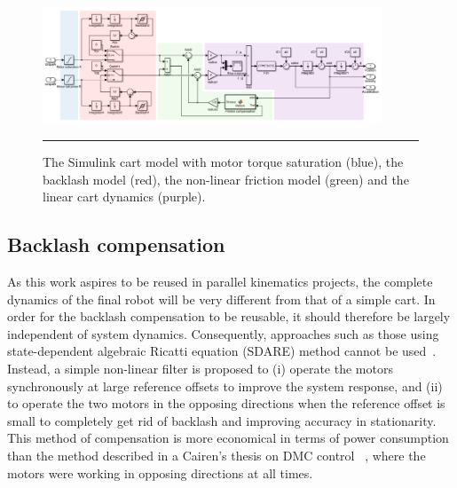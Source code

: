 \documentclass{article}
\begin{document}
\begin{figure}[htbp]
\centering
\includegraphics[width=0.9\textwidth]{figures/CartSimulink.png}
\rule{35em}{0.5pt}
\caption{The Simulink cart model with motor torque saturation (blue), the backlash model (red), the non-linear friction model (green) and the linear cart dynamics (purple).}
\label{fig:SimModel}
\end{figure}

\subsection{Backlash compensation}
As this work aspires to be reused in parallel kinematics projects, the complete dynamics of the final robot will be very different from that of a simple cart. In order for the backlash compensation to be reusable, it should therefore be largely independent of system dynamics. Consequently, approaches such as those using state-dependent algebraic Ricatti equation (SDARE) method cannot be used~\cite{friedland1997feedback}. Instead, a simple non-linear filter is proposed to (i) operate the motors synchronously at large reference offsets to improve the system response, and (ii) to operate the two motors in the opposing directions when the reference offset is small to completely get rid of backlash and improving accuracy in stationarity. This method of compensation is more economical in terms of power consumption than the method described in a Cairen's thesis on DMC control ~\cite{Patrik:2013}, where the motors were working in opposing directions at all times. 
\end{document}

